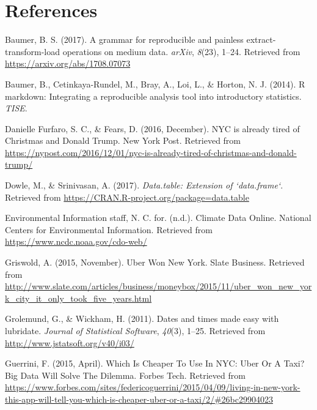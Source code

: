 \documentclass[12pt,twoside]{reedthesis}
\theoremstyle{definition}
\theoremstyle{definition}
\theoremstyle{definition}
\theoremstyle{remark}
\begin{document}
\chapter*{References}\label{references}


\noindent

\setlength{\parindent}{-0.20in} \setlength{\leftskip}{0.20in}
\setlength{\parskip}{8pt}

\hypertarget{refs}{}
\hypertarget{ref-pkgetl}{}
Baumer, B. S. (2017). A grammar for reproducible and painless
extract-transform-load operations on medium data. \emph{arXiv},
\emph{8}(23), 1--24. Retrieved from
\url{https://arxiv.org/abs/1708.07073}

\hypertarget{ref-baumer2014}{}
Baumer, B., Cetinkaya-Rundel, M., Bray, A., Loi, L., \& Horton, N. J.
(2014). R markdown: Integrating a reproducible analysis tool into
introductory statistics. \emph{TISE}.

\hypertarget{ref-furfaro2016}{}
Danielle Furfaro, S. C., \& Fears, D. (2016, December). NYC is already
tired of Christmas and Donald Trump. New York Post. Retrieved from
\url{https://nypost.com/2016/12/01/nyc-is-already-tired-of-christmas-and-donald-trump/}

\hypertarget{ref-pkgdatatable}{}
Dowle, M., \& Srinivasan, A. (2017). \emph{Data.table: Extension of
`data.frame`}. Retrieved from
\url{https://CRAN.R-project.org/package=data.table}

\hypertarget{ref-noaa}{}
Environmental Information staff, N. C. for. (n.d.). Climate Data Online.
National Centers for Environmental Information. Retrieved from
\url{https://www.ncdc.noaa.gov/cdo-web/}

\hypertarget{ref-ubernyc}{}
Griswold, A. (2015, November). Uber Won New York. Slate Business.
Retrieved from
\url{http://www.slate.com/articles/business/moneybox/2015/11/uber_won_new_york_city_it_only_took_five_years.html}

\hypertarget{ref-pkglubridate}{}
Grolemund, G., \& Wickham, H. (2011). Dates and times made easy with
lubridate. \emph{Journal of Statistical Software}, \emph{40}(3), 1--25.
Retrieved from \url{http://www.jstatsoft.org/v40/i03/}

\hypertarget{ref-guerrini2015}{}
Guerrini, F. (2015, April). Which Is Cheaper To Use In NYC: Uber Or A
Taxi? Big Data Will Solve The Dilemma. Forbes Tech. Retrieved from
\url{https://www.forbes.com/sites/federicoguerrini/2015/04/09/living-in-new-york-this-app-will-tell-you-which-is-cheaper-uber-or-a-taxi/2/\#26bc29904023}
\end{document}
